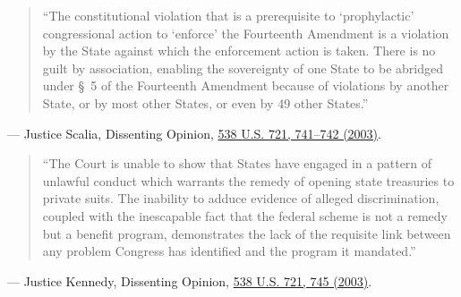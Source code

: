 \documentclass[12pt]{article}
\begin{document}
\begin{quote}
``The constitutional violation that is a prerequisite to `prophylactic' congressional action to `enforce' the Fourteenth Amendment is a violation by the State against which the enforcement action is taken. There is no guilt by association, enabling the sovereignty of one State to be abridged under \S~5 of the Fourteenth Amendment because of violations by another State, or by most other States, or even by 49 other States.''
\end{quote}
\noindent --- Justice Scalia, Dissenting Opinion, \href{https://supreme.justia.com/cases/federal/us/538/721/}{538 U.S. 721, 741--742 (2003)}.

\begin{quote}
``The Court is unable to show that States have engaged in a pattern of unlawful conduct which warrants the remedy of opening state treasuries to private suits. The inability to adduce evidence of alleged discrimination, coupled with the inescapable fact that the federal scheme is not a remedy but a benefit program, demonstrates the lack of the requisite link between any problem Congress has identified and the program it mandated.''
\end{quote}
\noindent --- Justice Kennedy, Dissenting Opinion, \href{https://supreme.justia.com/cases/federal/us/538/721/}{538 U.S. 721, 745 (2003)}.
\end{document}
